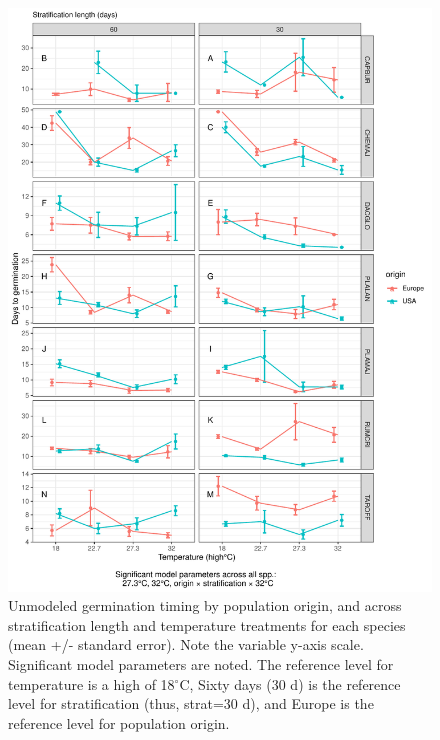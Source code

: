 \documentclass[12pt]{article}\usepackage[]{graphicx}\usepackage[]{color}
\begin{document}
\begin{figure}[H]
  \centering
  \includegraphics[scale=.8]{figure7} %
  \caption{Unmodeled germination timing by population origin, and across stratification length and temperature treatments for   each species (mean +/- standard error). Note the variable y-axis scale. Significant model parameters are noted. The reference level for temperature is a high of 18$^\circ$C, Sixty days (30 d) is the reference level for stratification (thus, strat=30 d), and Europe is the reference level for population origin.} \label{fig:rawtime} 
\end{figure}
\end{document}
